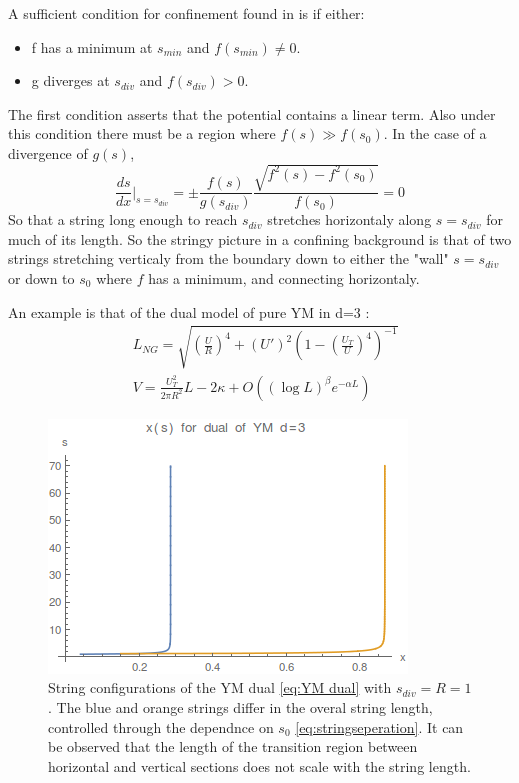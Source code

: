 \documentclass[11pt,a4paper]{article}
\begin{document}
A sufficient condition for confinement found in \cite{Sonnenschein00,Kinar98} is if either:
\begin{itemize}
\item f has a minimum at $s_{min}$ and $f\left(s_{min}\right)\neq0$.
\item g diverges at $s_{div}$ and $f\left(s_{div}\right)>0$.
\end{itemize}
The first condition asserts that the potential contains a linear term. Also under this condition there must be a region where $f\left(s\right)\gg f\left(s_0\right)$. In the case of a divergence of $g\left(s\right)$,
\begin{equation}
\frac{ds}{dx}|_{s=s_{div}}=\pm\frac{f\left(s\right)}{g\left(s_{div}\right)} \frac{\sqrt{f^2\left(s\right)-f^2\left(s_0\right)}}{f\left(s_0\right)}=0
\end{equation}
So that a string long enough to reach $s_{div}$ stretches horizontaly along $s=s_{div}$ for much of its length. So the stringy picture in a confining background is that of two strings stretching verticaly from the boundary down to either the "wall" $s=s_{div}$ or down to $s_0$ where $f$ has a minimum, and connecting horizontaly.

An example is that of the dual model of pure YM in d=3 \cite{Kinar98}:
\begin{subequations}
\label{eq:YM dual}
\begin{align}
&L_{NG}=\sqrt{\left(\frac{U}{R}\right)^4+\left(U'\right)^2\left(1-\left(\frac{U_T}{U}\right)^4\right)^{-1}} \\
&V=\frac{U_T^2}{2\pi R^2}L-2\kappa+O\left(\left(\log L\right)^\beta e^{-\alpha L}\right)
\end{align}
\end{subequations}

\begin{figure}
\centering
\includegraphics[scale=0.7]{figures/stringConfiguration.png}
\caption{String configurations of the YM dual \ref{eq:YM dual} with $s_{div}=R=1$. The blue and orange strings differ in the overal string length, controlled through the dependnce on $s_0$ \ref{eq:stringseperation}. It can be observed that the length of the transition region between horizontal and vertical sections does not scale with the string length.}
\end{figure}
\end{document}
